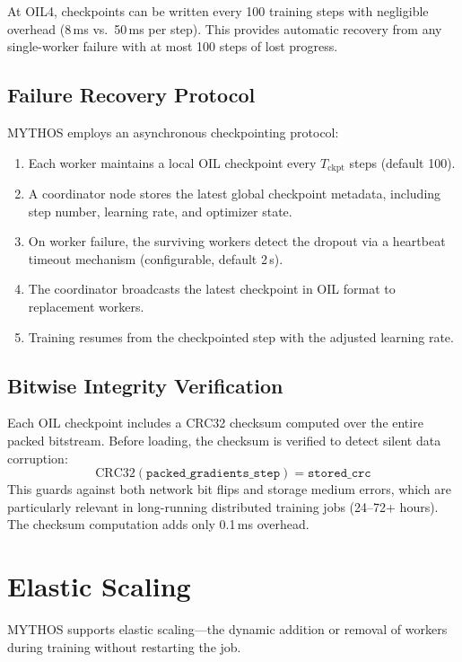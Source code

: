 At OIL4, checkpoints can be written every 100 training steps with negligible overhead (8\,ms vs.\ 50\,ms per step). This provides automatic recovery from any single-worker failure with at most 100 steps of lost progress.

\subsection{Failure Recovery Protocol}

MYTHOS employs an asynchronous checkpointing protocol:
\begin{enumerate}
    \item Each worker maintains a local OIL checkpoint every $T_{\text{ckpt}}$ steps (default 100).
    \item A coordinator node stores the latest global checkpoint metadata, including step number, learning rate, and optimizer state.
    \item On worker failure, the surviving workers detect the dropout via a heartbeat timeout mechanism (configurable, default 2\,s).
    \item The coordinator broadcasts the latest checkpoint in OIL format to replacement workers.
    \item Training resumes from the checkpointed step with the adjusted learning rate.
\end{enumerate}

\subsection{Bitwise Integrity Verification}

Each OIL checkpoint includes a CRC32 checksum computed over the entire packed bitstream. Before loading, the checksum is verified to detect silent data corruption:
\[
\text{CRC32}(\texttt{packed\_gradients\_step}) = \texttt{stored\_crc}
\]
This guards against both network bit flips and storage medium errors, which are particularly relevant in long-running distributed training jobs (24--72+ hours). The checksum computation adds only 0.1\,ms overhead.

\section{Elastic Scaling}
\label{sec:elastic}

MYTHOS supports elastic scaling---the dynamic addition or removal of workers during training without restarting the job.

